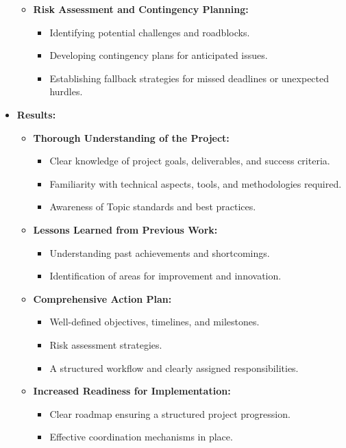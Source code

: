 \documentclass{article}
\begin{document}
\begin{itemize}[leftmargin=*, label={}]
\begin{itemize}
\begin{itemize}
        \end{itemize}
        \item \textbf{Risk Assessment and Contingency Planning:}
        \begin{itemize}
            \item Identifying potential challenges and roadblocks.
            \item Developing contingency plans for anticipated issues.
            \item Establishing fallback strategies for missed deadlines or unexpected hurdles.
        \end{itemize}
    \end{itemize}
    
    \item \textbf{Results:}
    \begin{itemize}
        \item \textbf{Thorough Understanding of the Project:}
        \begin{itemize}
            \item Clear knowledge of project goals, deliverables, and success criteria.
            \item Familiarity with technical aspects, tools, and methodologies required.
            \item Awareness of Topic standards and best practices.
        \end{itemize}
        \item \textbf{Lessons Learned from Previous Work:}
        \begin{itemize}
            \item Understanding past achievements and shortcomings.
            \item Identification of areas for improvement and innovation.
        \end{itemize}
        \item \textbf{Comprehensive Action Plan:}
        \begin{itemize}
            \item Well-defined objectives, timelines, and milestones.
            \item Risk assessment strategies.
            \item A structured workflow and clearly assigned responsibilities.
        \end{itemize}
        \item \textbf{Increased Readiness for Implementation:}
        \begin{itemize}
            \item Clear roadmap ensuring a structured project progression.
            \item Effective coordination mechanisms in place.
        \end{itemize}
    \end{itemize}
\end{itemize}
\end{document}
